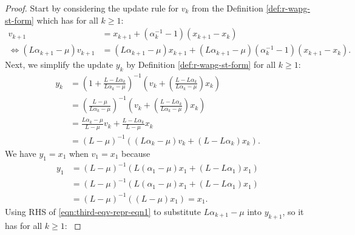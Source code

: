 \documentclass[12pt]{article}
\begin{document}
        \begin{proof}
            Start by considering the update rule for $v_k$ from the Definition \ref{def:r-wapg-st-form} which has for all $k \ge 1$: 
            \begin{align}
                v_{k + 1} &= 
                x_{k + 1} + (\alpha_k^{-1} - 1)(x_{k + 1} - x_k)
                \\
                \iff 
                (L \alpha_{k + 1} - \mu)v_{k + 1} 
                &= 
                (L \alpha_{k + 1} - \mu)x_{k + 1} + (L\alpha_{k + 1} - \mu)(\alpha_k^{-1} - 1)(x_{k + 1} - x_k).
                \label{eqn:third-eqv-repr-eqn1} 
            \end{align}
            Next, we simplify the update $y_{k}$ by Definition \ref{def:r-wapg-st-form} for all $k \ge 1$: 
            \begin{align*}
                y_k &= 
                \left(
                    1 + \frac{L - L\alpha_k}{L\alpha_k - \mu}
                \right)^{-1}
                \left(
                    v_k + 
                    \left(\frac{L - L\alpha_k}{L\alpha_k - \mu} \right) x_k
                \right)
                \\
                &= 
                \left(
                \frac{L - \mu}{L\alpha_k - \mu} 
                \right)^{-1}
                \left(
                    v_k + 
                    \left(\frac{L - L\alpha_k}{L\alpha_k - \mu} \right) x_k
                \right)
                \\
                &= 
                \frac{L\alpha_k - \mu}{L - \mu} v_k
                + 
                \frac{L - L \alpha_k}{L - \mu} x_k
                \\
                &= (L - \mu)^{-1}((L \alpha_k - \mu)v_k + (L - L \alpha_k)x_k). 
            \end{align*}
            We have $y_1 = x_1$ when $v_1 = x_1$ because
            \begin{align*}
                y_1 &= (L - \mu)^{-1}(L(\alpha_1 - \mu)x_1 + (L - L\alpha_1)x_1)
                \\
                &= (L - \mu)^{-1}(L(\alpha_1 - \mu)x_1 + (L - L \alpha_1)x_1)
                \\
                &= (L - \mu)^{-1}((L - \mu)x_1) = x_1. 
            \end{align*}
            Using RHS of \eqref{eqn:third-eqv-repr-eqn1} to substitute $L\alpha_{k + 1} - \mu$ into $y_{k + 1}$, so it has for all $k\ge 1$: 
            {\small
}
\end{proof}
\end{document}
